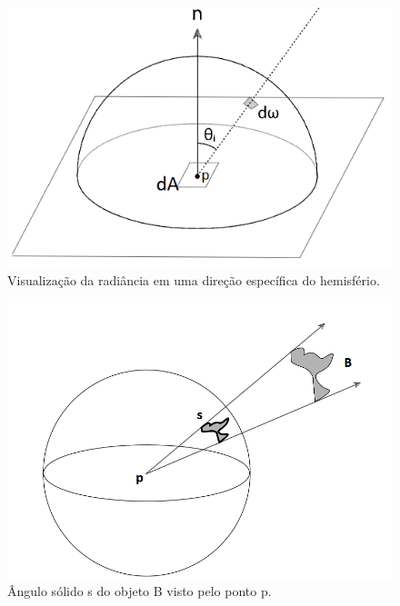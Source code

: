 \documentclass[english, 
               brazil, 
               bsc] %
               {dcomp-abntex2}
\begin{document}
\begin{figure}[h]
        \caption{\label{radiance-img} \small Visualização da radiância em uma direção específica do hemisfério. }
        \begin{center}
            \includegraphics[scale=0.5]{./Imagens/irradiance_hemisphere.png}
        \end{center}
\end{figure}


\begin{figure}[h]
  \caption{\label{solid-angle} \small   Ângulo sólido s do objeto B visto pelo ponto p. }
        \begin{center}
            \includegraphics[scale=0.5]{./Imagens/solid_angle.png}
        \end{center}
\end{figure}
\end{document}
